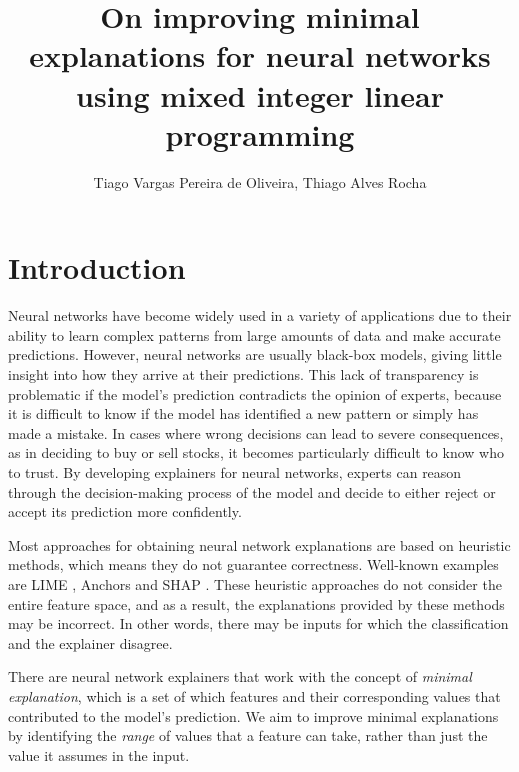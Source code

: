 \documentclass[12pt]{article}
\title{On improving minimal explanations for neural networks using mixed integer linear programming}
\author{Tiago Vargas Pereira de Oliveira\inst{1}, Thiago Alves Rocha\inst{1}}
\begin{document}
\maketitle

\begin{abstract}
\end{abstract}

\section{Introduction}

Neural networks have become widely used in a variety of applications due to their ability to learn complex patterns from large amounts of data and make accurate predictions.
However, neural networks are usually black-box models, giving little insight into how they arrive at their predictions.
This lack of transparency is problematic if the model's prediction contradicts the opinion of experts, because it is difficult to know if the model has identified a new pattern or simply has made a mistake.
In cases where wrong decisions can lead to severe consequences, as in deciding to buy or sell stocks, it becomes particularly difficult to know who to trust.
By developing explainers for neural networks, experts can reason through the decision-making process of the model and decide to either reject or accept its prediction more confidently.


Most approaches for obtaining neural network explanations are based on heuristic methods, which means they do not guarantee correctness.
Well-known examples are LIME \cite{ribeiro2016should}, Anchors \cite{Ribeiro_Singh_Guestrin_2018} and SHAP \cite{lundberg2017unified}.
These heuristic approaches do not consider the entire feature space, and as a result, the explanations provided by these methods may be incorrect. In other words, there may be inputs for which the classification and the explainer disagree.

There are neural network explainers that work with the concept of \emph{minimal explanation}, which is a set of which features and their corresponding values that contributed to the model's prediction.
We aim to improve minimal explanations by identifying the \emph{range} of values that a feature can take, rather than just the value it assumes in the input.
\end{document}

